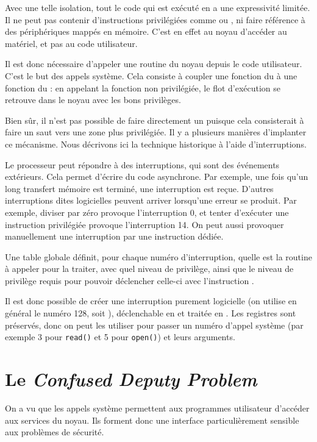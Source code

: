 Avec une telle isolation, tout le code qui est exécuté en  a une
expressivité limitée. Il ne peut pas contenir d'instructions privilégiées comme
 ou , ni faire référence à des périphériques mappés
en mémoire. C'est en effet au noyau d'accéder au matériel, et pas au code
utilisateur.

Il est donc nécessaire d'appeler une routine du noyau depuis le code
utilisateur. C'est le but des appels système. Cela consiste à coupler une
fonction du  à une fonction du : en appelant la fonction non
privilégiée, le flot d'exécution se retrouve dans le noyau avec les bons
privilèges.

Bien sûr, il n'est pas possible de faire directement un  puisque
cela consisterait à faire un saut vers une zone plus privilégiée. Il y a
plusieurs manières d'implanter ce mécanisme. Nous décrivons ici la technique
historique à l'aide d'interruptions.

Le processeur peut répondre à des interruptions, qui sont des événements
extérieurs. Cela permet d'écrire du code asynchrone. Par exemple, une fois qu'un
long transfert mémoire est terminé, une interruption est reçue. D'autres
interruptions dites logicielles peuvent arriver lorsqu'une erreur se produit.
Par exemple, diviser par zéro provoque l'interruption 0, et tenter d'exécuter
une instruction privilégiée provoque l'interruption 14. On peut aussi provoquer
manuellement une interruption par une instruction  dédiée.

Une table globale définit, pour chaque numéro d'interruption, quelle est la
routine à appeler pour la traiter, avec quel niveau de privilège, ainsi que le
niveau de privilège requis pour pouvoir déclencher celle-ci avec l'instruction
.

Il est donc possible de créer une interruption purement logicielle (on utilise
en général le numéro 128, soit ), déclenchable en  et traitée
en . Les registres sont préservés, donc on peut les utiliser pour passer
un numéro d'appel système (par exemple 3 pour \texttt{read()} et 5 pour
\texttt{open()}) et leurs arguments.

\section{Le \emph{Confused Deputy Problem}}
\label{sec:secu-syscalls}

On a vu que les appels système permettent aux programmes utilisateur d'accéder
aux services du noyau. Ils forment donc une interface particulièrement sensible
aux problèmes de sécurité.

